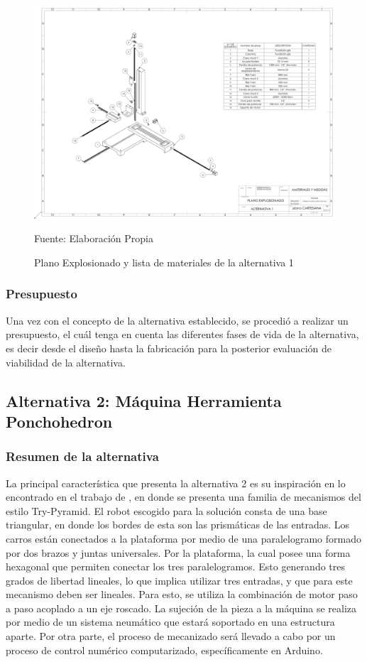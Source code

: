 \begin{figure}[htb!]
    \centering
    \includegraphics[width =  \textwidth]{Cap3_DisenoConceptual/Figura/Plano_alt_1.pdf}
    \caption{Plano Explosionado y lista de materiales de la alternativa 1}{Fuente: Elaboración Propia}
    \label{fig:Plano_alt_1}
\end{figure}

\subsubsection{Presupuesto}
Una vez con el concepto de la alternativa establecido, se procedió a realizar un presupuesto, el cuál tenga en cuenta las diferentes fases de vida de la alternativa, es decir desde el diseño hasta la fabricación para la posterior evaluación de viabilidad de la alternativa.



\subsection{Alternativa 2: Máquina Herramienta Ponchohedron}
\subsubsection{Resumen de la alternativa} 
La principal característica que presenta la alternativa 2 es su inspiración en lo encontrado en el trabajo de \cite{ZENG2014648}, en donde se presenta una familia de mecanismos del estilo Try-Pyramid. El robot escogido para la solución consta de una base triangular, en donde los bordes de esta son las prismáticas de las entradas. Los carros están conectados a la plataforma por medio de una paralelogramo formado por dos brazos y juntas universales. Por la plataforma, la cual posee una forma hexagonal que permiten conectar los tres paralelogramos. Esto generando tres grados de libertad lineales, lo que implica utilizar tres entradas, y que para este mecanismo deben ser lineales. Para esto, se utiliza la combinación de motor paso a paso acoplado a un eje roscado.
La sujeción de la pieza a la máquina se realiza por medio de un sistema neumático que estará soportado en una estructura aparte.
Por otra parte, el proceso de mecanizado será llevado a cabo por un proceso de control numérico computarizado, específicamente en Arduino.

